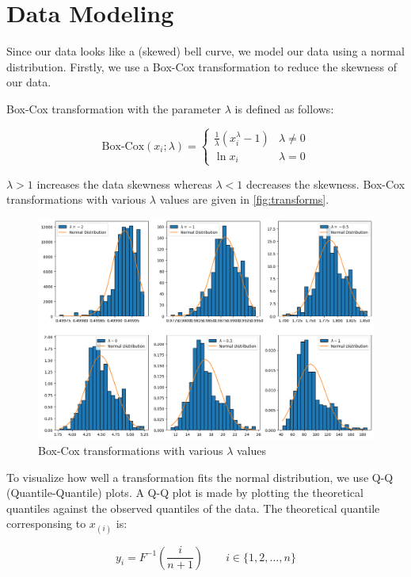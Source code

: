 \section{Data Modeling}

Since our data looks like a (skewed) bell curve, we model our data using a normal distribution.
Firstly, we use a Box-Cox transformation to reduce the skewness of our data.

Box-Cox transformation with the parameter $\lambda$ is defined as follows:

\[
\text{Box-Cox}(x_i; \lambda) =
\begin{cases}
\frac{1}{\lambda} (x_i ^ \lambda - 1) & \lambda \ne 0 \\
\ln x_i & \lambda = 0
\end{cases}
\]

\noindent $\lambda > 1$ increases the data skewness whereas $\lambda < 1$ decreases the skewness.
Box-Cox transformations with various $\lambda$ values are given in \autoref{fig:transforms}.

\begin{figure}[!ht]
  \centering
  \includegraphics[width=\textwidth]{images/transforms.png}
  \caption{Box-Cox transformations with various $\lambda$ values}
  \label{fig:transforms}
\end{figure}

To visualize how well a transformation fits the normal distribution, we use Q-Q (Quantile-Quantile) plots.
A Q-Q plot is made by plotting the theoretical quantiles against the observed quantiles of the data.
The theoretical quantile corresponsing to $x_{(i)}$ is:

\[ y_i = F^{-1}\left(\frac{i}{n + 1}\right) \qquad i \in \{1, 2, ..., n\} \]

